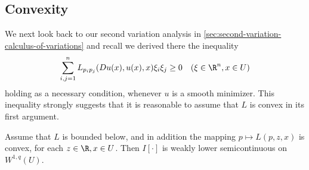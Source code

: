 \subsection{Convexity}
\label{sec:convexity-lower-semicontinuity-existence}

We next look back to our second variation analysis in \cref{sec:second-variation-calculus-of-variations} and recall we derived there the inequality
\[
\sum_{i,j=1}^n L_{p_i p_j}(Du(x), u(x), x) \xi_i \xi_j \geq 0 \quad (\xi \in \R^n, x \in U)
\]
holding as a necessary condition, whenever $u$ is a smooth minimizer. This inequality strongly suggests that it is reasonable to assume that $L$ is convex in its first argument.

\begin{theorem}
\label{thm:weak-lower-semicontinuity-convex-lagrangian}
Assume that $L$ is bounded below, and in addition the mapping $p \mapsto L(p,z,x)$ is convex, for each $z \in \R, x \in U$. Then $I[\cdot]$ is weakly lower semicontinuous on $W^{1,q}(U)$.
\end{theorem}
